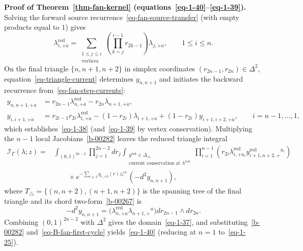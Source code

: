\documentclass[11pt]{article}
\numberwithin{equation}{section}
\numberwithin{figure}{section}
\numberwithin{table}{section}
\begin{document}
\begin{proofbox}
\textbf{Proof of Theorem~\ref{thm-fan-kernel} (equations~\eqref{eq-1-40}--\eqref{eq-1-39}).} Solving the forward source recurrence~\eqref{eq-fan-source-transfer} (with empty products equal to $1$) gives
\begin{equation}\label{eq-B-fan-first-cycle}
\lambda_{i,+\dot a}^{\mathrm{red}}
=\sum_{\substack{1\le j\le i\\\mathrm{vertices}}}
\left(\prod_{k=j}^{i-1}r_{2k-1}\right)\lambda_{j,+\dot a},
\qquad 1\le i\le n.
\end{equation}
On the final triangle $\{n,n+1,n+2\}$ in simplex coordinates $(r_{2n-1},r_{2n})\in\Delta^2$, equation~\eqref{eq-triangle-current} determines $y_{n,n+1}$ and initiates the backward recurrence from~\eqref{eq-fan-step-currents}:
\begin{equation}\label{eq-B-fan-general-fractions}
\begin{aligned}
y_{n,n+1,+\dot a}
&=r_{2n-1}\lambda_{n,+\dot a}^{\mathrm{red}}
-r_{2n}\lambda_{n+1,+\dot a},\\
y_{i,i+1,+\dot a}
&=r_{2i-1}r_{2i}\lambda_{i,+\dot a}^{\mathrm{red}}
-(1-r_{2i})\lambda_{i+1,+\dot a}
+(1-r_{2i})y_{i+1,i+2,+\dot a},
\qquad i=n-1,\ldots,1,
\end{aligned}
\end{equation}
which establishes~\eqref{eq-1-38} (and~\eqref{eq-1-39} by vertex conservation). Multiplying the $n-1$ local Jacobians~\eqref{b-00282} leaves the reduced triangle integral
\begin{equation}\label{eq-fan-operator-product}
\begin{aligned}
\mathcal I_\Gamma(\lambda;z)
={}&\int_{(0,1)^{2n-2}}\prod_{j=1}^{2n-2}dr_j
\int_{\substack{y^{\mathrm{red}}\in\Delta_\triangle\\
\text{current conservation at }\lambda^{\mathrm{red}}}}
\prod_{i=1}^{n-1}
\left(r_{2i}\lambda_{i,+\dot a_i}^{\mathrm{red}}
y_{i+1,n+2,+}^{\mathrm{red}}{}^{\dot a_i}\right)\\
&\qquad\times e^{-\sum_{e\in I}y_{e,+\dot b}(r)z_e^{+\dot b}}
\,(-d^2y_{n,n+1}),
\end{aligned}
\end{equation}
where $T_\triangle=\{(n,n+2),(n+1,n+2)\}$ is the spanning tree of the final triangle and its chord two-form~\eqref{b-00267} is
\begin{equation}\label{eq-B-fan-second-merge}
-d^2y_{n,n+1}
=\bigl(\lambda_{n,+\dot a}^{\mathrm{red}}\lambda_{n+1,+}{}^{\dot a}\bigr)
dr_{2n-1}\wedge dr_{2n}.
\end{equation}
Combining $(0,1)^{2n-2}$ with $\Delta^2$ gives the domain~\eqref{eq-1-37}, and substituting~\eqref{b-00282} and~\eqref{eq-B-fan-first-cycle} yields~\eqref{eq-1-40} (reducing at $n=1$ to~\eqref{eq-1-25}).~\hfill\qedsymbol
\end{proofbox}
\end{document}
